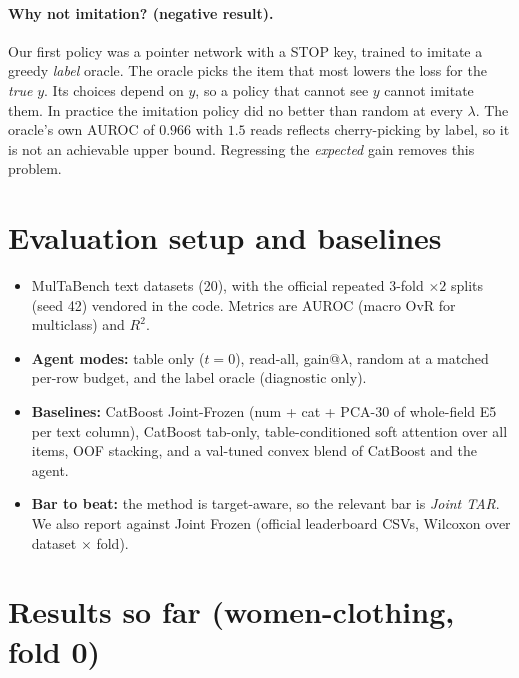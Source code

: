 \documentclass[11pt,a4paper]{article}
\begin{document}
\paragraph{Why not imitation? (negative result).}
Our first policy was a pointer network with a STOP key, trained to imitate a greedy \emph{label} oracle.
The oracle picks the item that most lowers the loss for the \emph{true} $y$.
Its choices depend on $y$, so a policy that cannot see $y$ cannot imitate them.
In practice the imitation policy did no better than random at every $\lambda$.
The oracle's own AUROC of $0.966$ with $1.5$ reads reflects cherry-picking by label, so it is not an achievable upper bound.
Regressing the \emph{expected} gain removes this problem.

\section{Evaluation setup and baselines}
\begin{itemize}[nosep]
  \item MulTaBench text datasets (20), with the official repeated 3-fold $\times2$ splits (seed 42) vendored in the code.
        Metrics are AUROC (macro OvR for multiclass) and $R^2$.
  \item \textbf{Agent modes:} table only ($t=0$), read-all, gain@$\lambda$, random at a matched per-row budget, and the label oracle (diagnostic only).
  \item \textbf{Baselines:} CatBoost Joint-Frozen (num + cat + PCA-30 of whole-field E5 per text column), CatBoost tab-only, table-conditioned soft attention over all items, OOF stacking, and a val-tuned convex blend of CatBoost and the agent.
  \item \textbf{Bar to beat:} the method is target-aware, so the relevant bar is \emph{Joint TAR}.
        We also report against Joint Frozen (official leaderboard CSVs, Wilcoxon over dataset $\times$ fold).
\end{itemize}

\section{Results so far (women-clothing, fold 0)}
\end{document}
